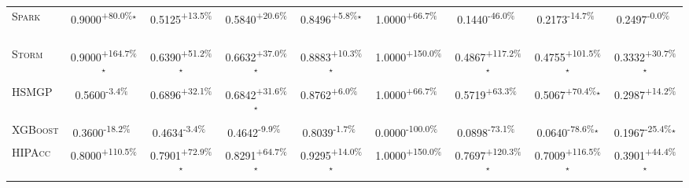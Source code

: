 \begin{table}[htbp]
\begin{tabular}{l|cccc|cccc}
\textsc{Spark} & \cellcolor{green!30}0.9000\textsuperscript{+80.0\%}$^\star$ & \cellcolor{green!30}0.5125\textsuperscript{+13.5\%}$^{\,\,\,}$ & \cellcolor{green!30}0.5840\textsuperscript{+20.6\%}$^{\,\,\,}$ & \cellcolor{green!30}0.8496\textsuperscript{+5.8\%}$^\star$ & \cellcolor{green!30}1.0000\textsuperscript{+66.7\%}$^{\,\,\,}$ & \cellcolor{red!30}0.1440\textsuperscript{-46.0\%}$^{\,\,\,}$ & \cellcolor{red!30}0.2173\textsuperscript{-14.7\%}$^{\,\,\,}$ & \cellcolor{red!30}0.2497\textsuperscript{-0.0\%}$^{\,\,\,}$ \\
\textsc{Storm} & \cellcolor{green!30}0.9000\textsuperscript{+164.7\%}$^\star$ & \cellcolor{green!30}0.6390\textsuperscript{+51.2\%}$^\star$ & \cellcolor{green!30}0.6632\textsuperscript{+37.0\%}$^\star$ & \cellcolor{green!30}0.8883\textsuperscript{+10.3\%}$^\star$ & \cellcolor{green!30}1.0000\textsuperscript{+150.0\%}$^{\,\,\,}$ & \cellcolor{green!30}0.4867\textsuperscript{+117.2\%}$^\star$ & \cellcolor{green!30}0.4755\textsuperscript{+101.5\%}$^\star$ & \cellcolor{green!30}0.3332\textsuperscript{+30.7\%}$^\star$ \\
\textsc{HSMGP} & \cellcolor{red!30}0.5600\textsuperscript{-3.4\%}$^{\,\,\,}$ & \cellcolor{green!30}0.6896\textsuperscript{+32.1\%}$^{\,\,\,}$ & \cellcolor{green!30}0.6842\textsuperscript{+31.6\%}$^\star$ & \cellcolor{green!30}0.8762\textsuperscript{+6.0\%}$^{\,\,\,}$ & \cellcolor{green!30}1.0000\textsuperscript{+66.7\%}$^{\,\,\,}$ & \cellcolor{green!30}0.5719\textsuperscript{+63.3\%}$^{\,\,\,}$ & \cellcolor{green!30}0.5067\textsuperscript{+70.4\%}$^\star$ & \cellcolor{green!30}0.2987\textsuperscript{+14.2\%}$^{\,\,\,}$ \\
\textsc{XGBoost} & \cellcolor{red!30}0.3600\textsuperscript{-18.2\%}$^{\,\,\,}$ & \cellcolor{red!30}0.4634\textsuperscript{-3.4\%}$^{\,\,\,}$ & \cellcolor{red!30}0.4642\textsuperscript{-9.9\%}$^{\,\,\,}$ & \cellcolor{red!30}0.8039\textsuperscript{-1.7\%}$^{\,\,\,}$ & \cellcolor{red!30}0.0000\textsuperscript{-100.0\%}$^{\,\,\,}$ & \cellcolor{red!30}0.0898\textsuperscript{-73.1\%}$^{\,\,\,}$ & \cellcolor{red!30}0.0640\textsuperscript{-78.6\%}$^\star$ & \cellcolor{red!30}0.1967\textsuperscript{-25.4\%}$^\star$ \\
\textsc{HIPAcc} & \cellcolor{green!30}0.8000\textsuperscript{+110.5\%}$^{\,\,\,}$ & \cellcolor{green!30}0.7901\textsuperscript{+72.9\%}$^\star$ & \cellcolor{green!30}0.8291\textsuperscript{+64.7\%}$^\star$ & \cellcolor{green!30}0.9295\textsuperscript{+14.0\%}$^\star$ & \cellcolor{green!30}1.0000\textsuperscript{+150.0\%}$^{\,\,\,}$ & \cellcolor{green!30}0.7697\textsuperscript{+120.3\%}$^\star$ & \cellcolor{green!30}0.7009\textsuperscript{+116.5\%}$^\star$ & \cellcolor{green!30}0.3901\textsuperscript{+44.4\%}$^\star$ \\

\end{tabular}
\end{table}
